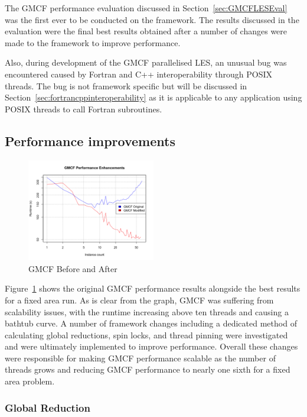 The GMCF performance evaluation discussed in Section~\ref{sec:GMCFLESEval} was
the first ever to be conducted on the framework. The results discussed in the
evaluation were the final best results obtained after a number of changes were
made to the framework to improve performance.

Also, during development of the GMCF parallelised LES, an unusual bug was
encountered caused by Fortran and C++ interoperability through POSIX threads.
The bug is not framework specific but will be discussed in
Section~\ref{sec:fortrancppinteroperability} as it is applicable to any
application using POSIX threads to call Fortran subroutines.

\subsection{Performance improvements}

\begin{figure}
    \includegraphics[width=0.5\textwidth]
    {graphs/GMCF-before-after-fixed-area.png}
    \caption{GMCF Before and After}
    \label{fig:gmcfbeforeandafter}
\end{figure}

Figure~\ref{fig:gmcfbeforeandafter} shows the original GMCF performance results
alongside the best results for a fixed area run. As is clear from the graph,
GMCF was suffering from scalability issues, with the runtime increasing above
ten threads and causing a bathtub curve. A number of framework changes including
a dedicated method of calculating global reductions, spin locks, and thread
pinning were investigated and were ultimately implemented to improve
performance. Overall these changes were responsible for making GMCF performance
scalable as the number of threads grows and reducing GMCF performance to nearly
one sixth for a fixed area problem.

\subsubsection{Global Reduction}

